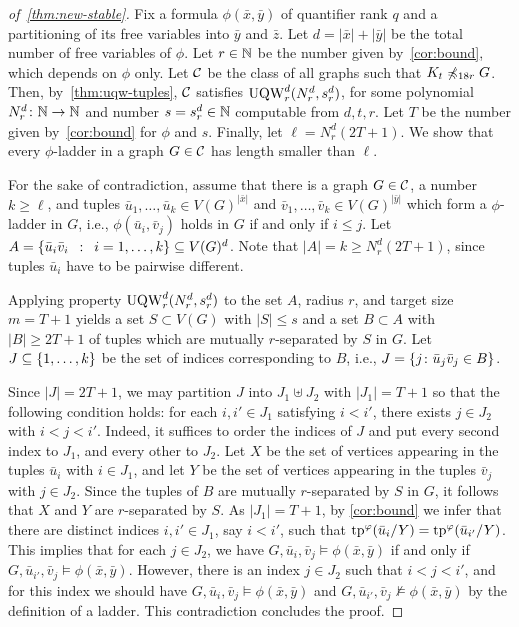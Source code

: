 \begin{proof}[of~\cref{thm:new-stable}]
Fix a formula $\phi(\bar x,\bar y)$ of quantifier rank $q$ and
a partitioning of its 
free variables into  $\bar y$ and $\bar z$.
Let $d=|\bar x|+|\bar y|$ be the total number of free variables of $\phi$.
Let $r\in \N$ be the number given by~\cref{cor:bound},
which depends on $\phi$ only.
Let $\cal C$ be the class of all graphs 
such that  $K_t\not\minor_{18r} G$.
Then, by~\cref{thm:uqw-tuples}, 
$\cal C$ satisfies $\uqw^d_{r}(N^d_{r},s^d_r)$,
for some  polynomial  $N^d_r\from\N\to\N$ and number $s=s^d_r\in \N$ computable from $d,t,r$.
Let $T$ be the number given by~\cref{cor:bound} for $\phi$ and $s$.
 Finally, let 
$\ell=N^d_r(2T+1)$.
We show that 
every $\phi$-ladder in a graph $G\in\cal C$ has length smaller than $\ell$.


For the sake of contradiction, assume that there is a graph $G\in\cal C$, a number $k\ge  \ell$,
and tuples $\bar u_1,\ldots,\bar u_k\in V(G)^{|\bar x|}$ and $ \bar v_1,\ldots, \bar v_k\in V(G)^{|\bar y|}$
which form a $\phi$-ladder in $G$, i.e., 
$\phi(\bar u_i,\bar v_j)$ holds in $G$ if and only if $i\le j$.
	Let $A=\setof{ \bar u_i \bar v_i}{i=1,\ldots,k}\subset V(G)^d$. Note that $|A|=k\ge N^d_r(2T+1)$, since tuples $\bar u_i$ have to be pairwise different.
  
Applying property  $\uqw^d_r(N^d_r,s^d_r)$ to the set $A$, radius $r$, and target size $m=T+1$
		 yields a set $S\subset V(G)$ with $|S|\le s$
	and a set $B\subset A$ with $|B|\geq 2T+1$ 
  of tuples which are  mutually $r$-separated by $S$  in $G$.
  Let $J\subseteq \set{1,\ldots,k}$
  be the set of indices corresponding to $B$,
  i.e., $J=\set{j\colon\bar u_j\bar v_j\in B}$.
  
  Since $|J|=2T+1$, we may partition $J$ into $J_1\uplus J_2$ with $|J_1|=T+1$ so that the following condition holds:
  for each $i,i'\in J_1$ satisfying $i<i'$, there exists $j\in J_2$ with $i<j<i'$. Indeed, it suffices to order the indices of $J$ and put every second index to $J_1$, and every other to $J_2$.
  Let $X$ be the set of vertices appearing in the tuples $\bar u_i$ with $i\in J_1$, and let $Y$ be the set of vertices appearing in the tuples $\bar v_j$ with $j\in J_2$.
  Since the tuples of $B$ are mutually $r$-separated by $S$ in $G$, it follows that $X$ and $Y$ are $r$-separated by $S$.
  As $|J_1|=T+1$, by \cref{cor:bound} we infer that there are distinct indices $i,i'\in J_1$, say $i<i'$, such that $\tp^\phi(\bar u_i/Y)=
    \tp^\phi(\bar u_{i'}/Y)$. This implies that for each $j\in J_2$, we have $G,\bar u_i,\bar v_j\models \phi(\bar x,\bar y)$ if and only if $G,\bar u_{i'},\bar v_j\models \phi(\bar x,\bar y)$.
    However, there is an index $j\in J_2$ such that $i<j<i'$, and for this index we should have $G,\bar u_i,\bar v_j\models \phi(\bar x,\bar y)$ and $G,\bar u_{i'},\bar v_j\not\models \phi(\bar x,\bar y)$
    by the definition of a ladder. This contradiction concludes the proof.
\end{proof}
